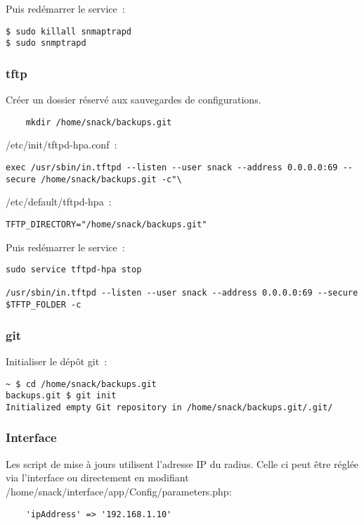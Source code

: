 Puis redémarrer le service~:

\begin{lstlisting}
$ sudo killall snmaptrapd
$ sudo snmptrapd 
\end{lstlisting}

\subsubsection{tftp}

Créer un dossier réservé aux sauvegardes de configurations.

\begin{lstlisting}
    mkdir /home/snack/backups.git
\end{lstlisting}

/etc/init/tftpd-hpa.conf~:

\begin{lstlisting}
exec /usr/sbin/in.tftpd --listen --user snack --address 0.0.0.0:69 --secure /home/snack/backups.git -c"\
\end{lstlisting}

/etc/default/tftpd-hpa~:
\begin{lstlisting}
TFTP_DIRECTORY="/home/snack/backups.git"
\end{lstlisting}

Puis redémarrer le service~:
\begin{lstlisting}
sudo service tftpd-hpa stop

/usr/sbin/in.tftpd --listen --user snack --address 0.0.0.0:69 --secure $TFTP_FOLDER -c
\end{lstlisting}

\subsubsection{git}

Initialiser le dépôt git~:

\begin{lstlisting}
~ $ cd /home/snack/backups.git
backups.git $ git init
Initialized empty Git repository in /home/snack/backups.git/.git/
\end{lstlisting}


\subsubsection{Interface}

Les script de mise à jours utilisent l'adresse IP du radius. Celle ci peut être réglée via l'interface ou directement en modifiant /home/snack/interface/app/Config/parameters.php:
\begin{lstlisting}
    'ipAddress' => '192.168.1.10'
\end{lstlisting}


